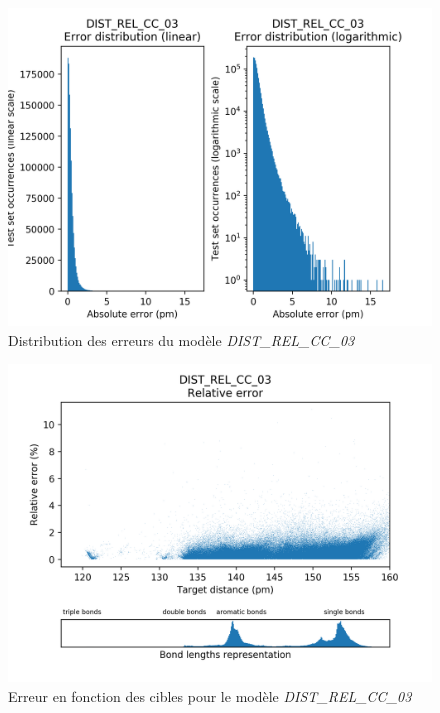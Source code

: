 
\begin{figure}[!h]
	\centering
	
	\includegraphics[scale=0.8]{../figures/DIST_REL_CC_03/DIST_REL_CC_03_distrib_rmse_val.png}	
	
	\caption{Distribution des erreurs du modèle \emph{DIST\_REL\_CC\_03}}
\end{figure}

\begin{figure}[!h]
	\centering
	
	\includegraphics[scale=0.8]{../figures/DIST_REL_CC_03/DIST_REL_CC_03_distrib_rmse_dist.png}	
	
	\caption{Erreur en fonction des cibles pour le modèle \emph{DIST\_REL\_CC\_03}}
\end{figure}

